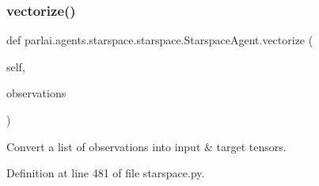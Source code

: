 \subsubsection{\texorpdfstring{vectorize()}{vectorize()}}
{\footnotesize\ttfamily def parlai.\+agents.\+starspace.\+starspace.\+Starspace\+Agent.\+vectorize (\begin{DoxyParamCaption}\item[{}]{self,  }\item[{}]{observations }\end{DoxyParamCaption})}

\begin{DoxyVerb}Convert a list of observations into input & target tensors.
\end{DoxyVerb}
 

Definition at line 481 of file starspace.\+py.


